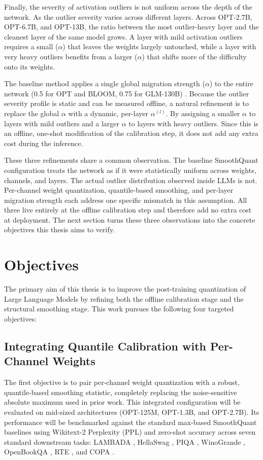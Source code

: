 Finally, the severity of activation outliers is not uniform across the depth of the network. As the outlier severity varies across different layers. Across OPT-2.7B, OPT-6.7B, and OPT-13B, the ratio between the most outlier-heavy layer and the cleanest layer of the same model grows. A layer with mild activation outliers requires a small ($\alpha$) that leaves the weights largely untouched, while a layer with very heavy outliers benefits from a larger ($\alpha$) that shifts more of the difficulty onto its weights. 

The baseline method applies a single global migration strength ($\alpha$) to the entire network (0.5 for OPT and BLOOM, 0.75 for GLM-130B) \cite{smoothquant_paper}. Because the outlier severity profile is static and can be measured offline, a natural refinement is to replace the global $\alpha$ with a dynamic, per-layer $\alpha^{(l)}$. By assigning a smaller $\alpha$ to layers with mild outliers and a larger $\alpha$ to layers with heavy outliers. Since this is an offline, one-shot modification of the calibration step, it does not add any extra cost during the inference.

\medskip
These three refinements share a common observation. The baseline SmoothQuant configuration treats the network as if it were statistically uniform across weights, channels, and layers. The actual outlier distribution observed inside LLMs is not. Per-channel weight quantization, quantile-based smoothing, and per-layer migration strength each address one specific mismatch in this assumption. All three live entirely at the offline calibration step and therefore add no extra cost at deployment. The next section turns these three observations into the concrete objectives this thesis aims to verify.

\section{Objectives}

The primary aim of this thesis is to improve the post-training quantization of Large Language Models by refining both the offline calibration stage and the structural smoothing stage. This work pursues the following four targeted objectives:

\subsection{Integrating Quantile Calibration with Per-Channel Weights}
The first objective is to pair per-channel weight quantization with a robust, quantile-based smoothing statistic, completely replacing the noise-sensitive absolute maximum used in prior work. This integrated configuration will be evaluated on mid-sized architectures (OPT-125M, OPT-1.3B, and OPT-2.7B)\cite{opt_paper}. Its performance will be benchmarked against the standard max-based SmoothQuant baselines using Wikitext-2 Perplexity (PPL) and zero-shot accuracy across seven standard downstream tasks: LAMBADA \cite{lambada_dataset}, HellaSwag \cite{hellaswag_dataset}, PIQA \cite{piqa_dataset}, WinoGrande \cite{winogrande_dataset}, OpenBookQA \cite{openbookqa_dataset}, RTE \cite{rte_dataset}, and COPA \cite{copa_dataset}.

